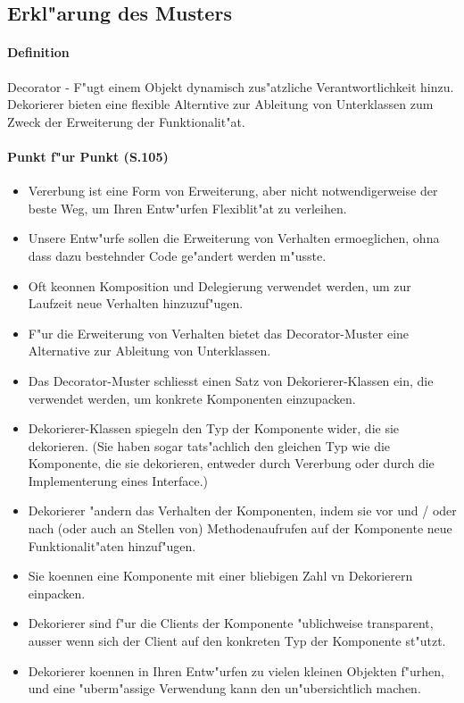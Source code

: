 \subsection{Erkl"arung des Musters}
\paragraph{Definition}
Decorator - F"ugt einem Objekt dynamisch zus"atzliche Verantwortlichkeit hinzu. Dekorierer bieten 
eine flexible Alterntive zur Ableitung von Unterklassen zum Zweck der Erweiterung der 
Funktionalit"at.

\paragraph{Punkt f"ur Punkt (S.105)}
\begin{itemize}
\item Vererbung ist eine Form von Erweiterung, aber nicht notwendigerweise der beste Weg, um Ihren 
  Entw"urfen Flexiblit"at zu verleihen. 
\item Unsere Entw"urfe sollen die Erweiterung von Verhalten ermoeglichen, ohna dass dazu bestehnder 
  Code ge"andert werden m"usste.
\item Oft keonnen Komposition und Delegierung verwendet werden, um zur Laufzeit neue Verhalten 
  hinzuzuf"ugen.
\item F"ur die Erweiterung von Verhalten bietet das Decorator-Muster eine Alternative zur Ableitung 
  von Unterklassen.
\item Das Decorator-Muster schliesst einen Satz von Dekorierer-Klassen ein, die verwendet werden, um 
  konkrete Komponenten einzupacken. 
\item Dekorierer-Klassen spiegeln den Typ der Komponente wider, die sie dekorieren. (Sie haben sogar 
  tats"achlich den gleichen Typ wie die Komponente, die sie dekorieren, entweder durch Vererbung 
  oder durch die Implementerung eines Interface.)
\item Dekorierer "andern das Verhalten der Komponenten, indem sie vor und / oder nach (oder auch an 
  Stellen von) Methodenaufrufen auf der Komponente neue Funktionalit"aten hinzuf"ugen. 
\item Sie koennen eine Komponente mit einer bliebigen Zahl vn Dekorierern einpacken. 
\item Dekorierer sind f"ur die Clients der Komponente "ublichweise transparent, ausser wenn sich der 
  Client auf den konkreten Typ der Komponente st"utzt.
\item Dekorierer koennen in Ihren Entw"urfen zu vielen kleinen Objekten f"urhen, und eine 
  "uberm"assige Verwendung kann den un"ubersichtlich machen.  
\end{itemize}
 
